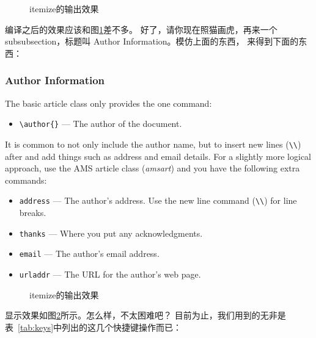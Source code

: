 \begin{figure}
  \centering
  \caption{itemize的输出效果\label{fig:itemize}}  
\end{figure}

编译之后的效果应该和图\ref{fig:itemize}差不多。
好了，请你现在照猫画虎，再来一个 subsubsection，标题叫 Author Information。模仿上面的东西，
来得到下面的东西：

\begin{codeblock}[.9]
\begin{latexcode}
  \subsubsection{Author Information}
  \label{sec:author-information}
  
  The basic article class only provides the one command:
  \begin{itemize}
  \item \verb|\author{}| --- The author of the document.
  \end{itemize}
  
  It is common to not only include the author name, but
  to insert new lines (\verb|\\|) after and add things
  such as address and email details.  For a slightly more
  logical approach, use the AMS article class (\emph{amsart})
  and you have the following extra commands:
  
  \begin{itemize}
  \item \texttt{address} --- The author's address.  Use the
    new line command (\verb|\\|) for line breaks.
  \item \texttt{thanks} --- Where you put any acknowledgments.
  \item \texttt{email} --- The author's email address.
  \item \texttt{urladdr} --- The URL for the author's web page.
  \end{itemize}
\end{latexcode}
\end{codeblock}

\begin{figure}
  \centering
  \caption{itemize的输出效果\label{fig:env4}}  
\end{figure}

显示效果如图\ref{fig:env4}所示。怎么样，不太困难吧？ 目前为止，我们用到的无非是
表~\ref{tab:keys}中列出的这几个快捷键操作而已：

